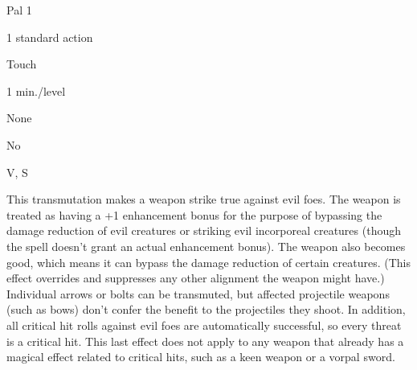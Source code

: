 
\begin{description*}
\item[Level:] Pal 1
\item[Casting Time:] 1 standard action
\item[Range:] Touch
\item[Duration:] 1 min./level
\item[Saving Throw:] None
\item[Spell Resistance:] No
\item[Components:] V, S
\end{description*}

This transmutation makes a weapon strike true against evil foes. The weapon is
treated as having a +1 enhancement bonus for the purpose of bypassing the damage
reduction of evil creatures or striking evil incorporeal creatures (though the
spell doesn't grant an actual enhancement bonus). The weapon also becomes good,
which means it can bypass the damage reduction of certain creatures. (This effect
overrides and suppresses any other alignment the weapon might have.) Individual
arrows or bolts can be transmuted, but affected projectile weapons (such as bows)
don't confer the benefit to the projectiles they shoot.
In addition, all critical hit rolls against evil foes are automatically successful,
so every threat is a critical hit. This last effect does not apply to any weapon
that already has a magical effect related to critical hits, such as a keen weapon
or a vorpal sword.